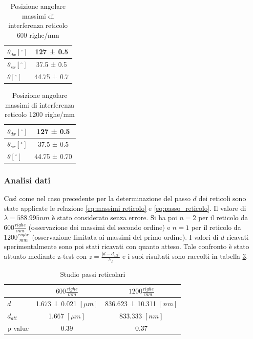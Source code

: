 \documentclass[a4paper]{article}
\begin{document}
\begin{table}[htbp]
\centering
\begin{tabular}{|l|c|}
\hline
$\theta_{dx} [^\circ]$ & 127 ± 0.5 \\\hline
$\theta_{sx} [^\circ]$ & 37.5 ± 0.5 \\\hline
$\theta [^\circ]$ & 44.75 ± 0.7  \\\hline
\end{tabular}
\caption{Posizione angolare massimi di interferenza reticolo 600 righe/mm}
\label{tab:angoli_600}
\end{table}

\begin{table}[htbp]
\centering
\begin{tabular}{|l|c|}
\hline
$\theta_{dx} [^\circ]$ & 127 ± 0.5 \\\hline
$\theta_{sx} [^\circ]$ & 37.5 ± 0.5 \\\hline
$\theta [^\circ]$ & 44.75 ± 0.70  \\\hline
\end{tabular}
\caption{Posizione angolare massimi di interferenza reticolo 1200 righe/mm}
\label{tab:angoli_1200}
\end{table}

\subsubsection{Analisi dati}
Così come nel caso precedente per la determinazione del passo $d$ dei reticoli sono state applicate le relazione \ref{eq:massimi reticolo} e \ref{eq:passo_reticolo}. Il valore di $\lambda=588.995 nm$ è stato considerato senza errore. Si ha poi $n=2$ per il reticolo da $600 \frac{righe}{mm}$ (osservazione dei massimi del secondo ordine) e $n=1$ per il reticolo da $1200 \frac{righe}{mm}$ (osservazione limitata ai massimi del primo ordine). I valori di $d$ ricavati sperimentalmente sono poi stati ricavati con quanto atteso. Tale confronto è stato attuato mediante z-test con $z = \frac{|d-d_{att}|}{\delta_d}$ e i suoi risultati sono raccolti in tabella \ref{tab:passi+test_compatibilità}.

\begin{table}[htbp]
\centering
\begin{tabular}{|l|c|c|}
\hline
 & $600 \frac{righe}{mm}$ & $1200 \frac{righe}{mm}$ \\\hline
$d$ & 1.673 ± 0.021 $[\mu m]$ & 836.623 ± 10.311 $[nm]$\\\hline
$d_{att} $ & 1.667 $[\mu m]$ & 833.333 $[nm]$\\\hline
p-value &  0.39 & 0.37 \\\hline
\end{tabular}
\caption{Studio passi reticolari}
\label{tab:passi+test_compatibilità}
\end{table}
\end{document}
